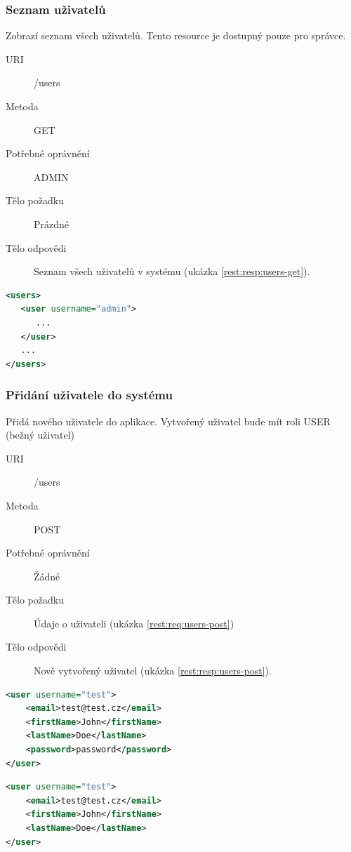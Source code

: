 \documentclass[thesis=M,czech]{FITthesis}[2014/05/6]
\begin{document}
\subsubsection{Seznam uživatelů}
Zobrazí seznam všech uživatelů. Tento resource je dostupný pouze pro správce.
\begin{description}
  \item[URI] /users
  \item[Metoda] GET
  \item[Potřebné oprávnění] ADMIN
  \item[Tělo požadku] Prázdné
  \item[Tělo odpovědi] Seznam všech uživatelů v systému (ukázka \ref{rest:resp:users-get}).
\end{description}

\begin{lstlisting}[caption=Tělo odpovědi zdroje /users (GET), label=rest:resp:users-get, language=xml]
<users>
   <user username="admin">
      ...
   </user>
   ...
</users>
\end{lstlisting}  

\subsubsection{Přidání uživatele do systému}
Přidá nového uživatele do aplikace. Vytvořený uživatel bude mít roli USER (bežný uživatel)
\begin{description}
  \item[URI] /users
  \item[Metoda] POST
  \item[Potřebné oprávnění] Žádné
  \item[Tělo požadku] Údaje o uživateli (ukázka \ref{rest:req:users-post})
  \item[Tělo odpovědi] Nově vytvořený uživatel (ukázka \ref{rest:resp:users-post}).
\end{description}

\begin{lstlisting}[caption=Tělo požadavku zdroje /users (POST), label=rest:req:users-post, language=xml]
<user username="test">
    <email>test@test.cz</email>
    <firstName>John</firstName>
    <lastName>Doe</lastName>
    <password>password</password>
</user>
\end{lstlisting}  

\begin{lstlisting}[caption=Tělo odpovědi zdroje /users (POST), label=rest:resp:users-post, language=xml]
<user username="test">
    <email>test@test.cz</email>
    <firstName>John</firstName>
    <lastName>Doe</lastName>
</user>
\end{lstlisting}
\end{document}
